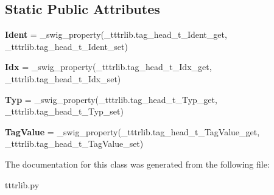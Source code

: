 \subsection*{Static Public Attributes}
\begin{DoxyCompactItemize}
\item 
\mbox{\label{classtttrlib_1_1tag__head__t_aa99bb3c26db27e0194394585538752f9}} 
{\bfseries Ident} = \+\_\+swig\+\_\+property(\+\_\+tttrlib.\+tag\+\_\+head\+\_\+t\+\_\+\+Ident\+\_\+get, \+\_\+tttrlib.\+tag\+\_\+head\+\_\+t\+\_\+\+Ident\+\_\+set)
\item 
\mbox{\label{classtttrlib_1_1tag__head__t_a0910d4a4495d62b476586ca1ea18ed9f}} 
{\bfseries Idx} = \+\_\+swig\+\_\+property(\+\_\+tttrlib.\+tag\+\_\+head\+\_\+t\+\_\+\+Idx\+\_\+get, \+\_\+tttrlib.\+tag\+\_\+head\+\_\+t\+\_\+\+Idx\+\_\+set)
\item 
\mbox{\label{classtttrlib_1_1tag__head__t_a73168a597186778c9cc8d38737953901}} 
{\bfseries Typ} = \+\_\+swig\+\_\+property(\+\_\+tttrlib.\+tag\+\_\+head\+\_\+t\+\_\+\+Typ\+\_\+get, \+\_\+tttrlib.\+tag\+\_\+head\+\_\+t\+\_\+\+Typ\+\_\+set)
\item 
\mbox{\label{classtttrlib_1_1tag__head__t_af02afecb10b6231af705a9a5f8cc9c24}} 
{\bfseries Tag\+Value} = \+\_\+swig\+\_\+property(\+\_\+tttrlib.\+tag\+\_\+head\+\_\+t\+\_\+\+Tag\+Value\+\_\+get, \+\_\+tttrlib.\+tag\+\_\+head\+\_\+t\+\_\+\+Tag\+Value\+\_\+set)
\end{DoxyCompactItemize}


The documentation for this class was generated from the following file\+:\begin{DoxyCompactItemize}
\item 
tttrlib.\+py\end{DoxyCompactItemize}
